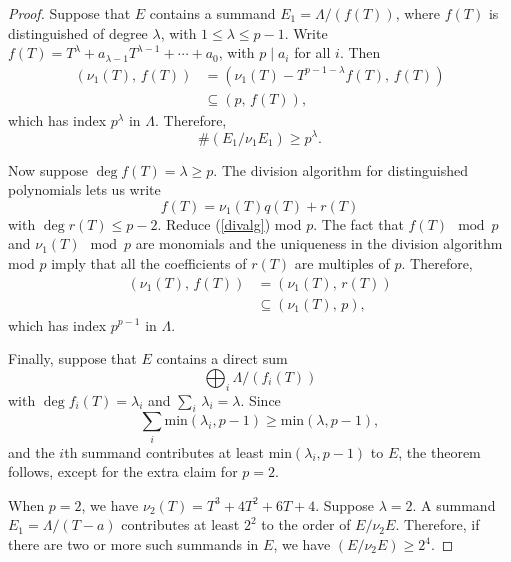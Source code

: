 \documentclass{amsart}
\begin{document}
\begin{proof} 
Suppose that $E$ contains a summand $E_1=\Lambda/(f(T))$, where $f(T)$ is distinguished of degree $\lambda$,
with $1\le \lambda \le p-1$.
Write $f(T)=T^{\lambda}+a_{\lambda-1}T^{\lambda-1}+\cdots+a_0$, with $p\mid a_i$ for all $i$.
Then
\begin{align*}
(\nu_1(T), \, f(T)) &= (\nu_1(T)-T^{p-1-\lambda}f(T), \, f(T))\\
&\subseteq (p,   \, f(T)),
\end{align*}
which has index $p^{\lambda}$ in $\Lambda$. Therefore, 
$$\#(E_1/\nu_1E_1)\ge p^{\lambda}.$$

Now suppose $\deg f(T)=\lambda \ge p$. The division algorithm for distinguished polynomials lets us write
\begin{equation}\label{divalg}
f(T)=\nu_1(T) q(T) + r(T)
\end{equation}
with $\deg r(T)\le p-2$. Reduce (\ref{divalg}) mod $p$. The fact that $f(T) \mod p$ 
and $\nu_1(T) \mod p$ are monomials and the uniqueness in the division algorithm mod $p$ imply that
all the coefficients of $r(T)$ are multiples of $p$. Therefore,
\begin{align*}
(\nu_1(T),\, f(T)) &= (\nu_1(T),\, r(T))\\
&\subseteq (\nu_1(T), \, p),
\end{align*}
which has index $p^{p-1}$ in $\Lambda$. 

Finally, suppose that $E$ contains a direct sum
$$
\bigoplus_i \Lambda/(f_i(T))
$$
with $\deg f_i(T) = \lambda_i $ and $\sum_i \, \lambda_i = \lambda$.
Since
$$
\sum_i \text{min}(\lambda_i, p-1) \ge \text{min}(\lambda, p-1),
$$
and the $i$th summand contributes at least $\text{min}(\lambda_i, p-1)$ to $E$, the theorem follows, except
for the extra claim for $p=2$.

When $p=2$, we have $\nu_2(T)=T^3+4T^2+6T+4$. Suppose $\lambda = 2$. A summand $E_1=\Lambda/(T-a)$
contributes at least $2^{2}$ to the order of $E/\nu_2E$. Therefore, if there are two or more such
summands in $E$, we have $(E/\nu_2E)\ge 2^4$. 


\end{proof}
\end{document}

